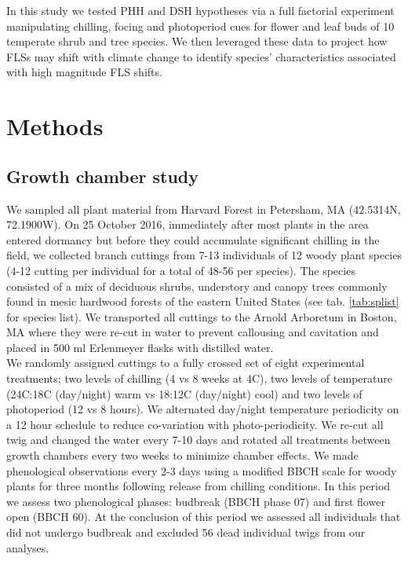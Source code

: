 \documentclass[11pt]{article}\usepackage[]{graphicx}\usepackage[]{color}
\begin{document}
\noindent In this study we tested PHH and DSH hypotheses via a full factorial experiment manipulating chilling, focing and photoperiod cues for flower and leaf buds of 10 temperate shrub and tree species. We then leveraged these data to project how FLSs may shift with climate change to identify species' characteristics associated with high magnitude FLS shifts.\\

\section*{Methods}

\subsection*{Growth chamber study}

\noindent We sampled all plant material from Harvard Forest in Petersham, MA (42.5314\degree N, 72.1900\degree W). On 25 October 2016, immediately after most plants in the area entered dormancy but before they could accumulate significant chilling in the field,  we collected branch cuttings from 7-13 individuals of 12 woody plant species (4-12 cutting per individual for a total of 48-56 per species). The species consisted of a mix of deciduous shrubs, understory and canopy trees commonly found in mesic hardwood forests of the eastern United States (see tab. \ref{tab:splist} for species list). We transported all cuttings to the Arnold Arboretum in Boston, MA where they were re-cut in water to prevent callousing and cavitation and placed in 500 ml Erlenmeyer flasks with distilled water.\\ 

\noindent We randomly assigned cuttings to a fully crossed set of eight experimental treatments; two levels of chilling (4 vs 8 weeks at 4\degree C), two levels of temperature (24\degree C:18\degree C (day/night) warm vs 18\degree:12\degree C (day/night) cool) and two levels of photoperiod (12 vs 8 hours). We alternated day/night temperature periodicity on a 12 hour schedule to reduce co-variation with photo-periodicity. We re-cut all twig and changed the water every 7-10 days and rotated all treatments between growth chambers every two weeks to minimize chamber effects. We made phenological observations every 2-3 days using a modified BBCH scale for woody plants \citep{Finn2007} for three months following release from chilling conditions. In this period we assess two phenological phases: budbreak (BBCH phase 07) %
and first flower open (BBCH 60). At the conclusion of this period we assessed all individuals that did not undergo budbreak and excluded 56 dead individual twigs from our analyses. 
\end{document}
